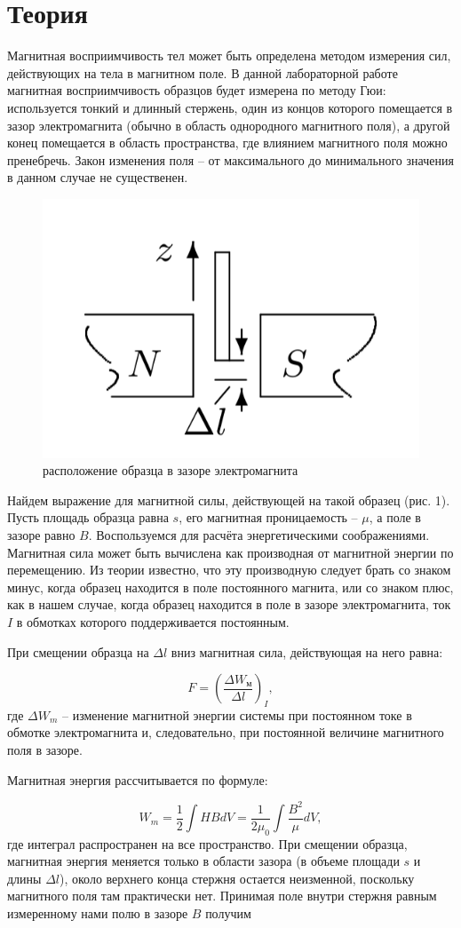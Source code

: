 \documentclass[a4paper,14pt]{article}
\begin{document}
\section*{Теория}
Магнитная восприимчивость тел может быть определена методом измерения сил, действующих на тела в магнитном поле. В данной лабораторной работе магнитная восприимчивость образцов будет измерена по методу Гюи: используется тонкий и длинный стержень, один из концов которого помещается в зазор электромагнита (обычно в область однородного магнитного поля), а другой конец помещается в область пространства, где влиянием магнитного поля можно пренебречь. Закон изменения поля -- от максимального до минимального значения в данном случае не существенен. 

\begin{figure}[bhtp]
	\centering
	\includegraphics[width=0.3\linewidth]{first}
	\caption{расположение образца в зазоре электромагнита}
\end{figure}

Найдем выражение для магнитной силы, действующей на такой образец (рис. 1). Пусть площадь образца равна $s$, его магнитная проницаемость -- $\mu$, а поле в зазоре равно $B$.
Воспользуемся для расчёта энергетическими соображениями. Магнитная сила может быть вычислена как производная от магнитной энергии по перемещению. Из теории известно, что эту производную следует брать со знаком минус, когда образец находится в поле постоянного магнита, или со знаком плюс, как в нашем случае, когда образец находится в поле в зазоре электромагнита, ток $I$ в обмотках которого поддерживается постоянным.

При смещении образца на $\Delta l$ вниз магнитная сила, действующая на него равна:

\begin{equation}
F = \left( \dfrac{\Delta W_{\text{м}}}{\Delta l}\right)_I,
\end{equation}
где $\Delta W_{m}$ -- изменение магнитной энергии системы при постоянном токе в обмотке электромагнита и, следовательно, при постоянной величине магнитного поля в зазоре.

Магнитная энергия рассчитывается по формуле:

\begin{equation}
W_{m} =  \dfrac{1}{2} \int H B dV = \dfrac{1}{2\mu_0}  \int \dfrac{B^2}{\mu} dV,
\end{equation}
где интеграл распространен на все пространство. При смещении образца, магнитная энергия меняется только в области зазора (в объеме площади $s$ и длины $\Delta l$), около верхнего конца стержня остается неизменной, поскольку магнитного поля там практически нет. Принимая поле внутри стержня равным измеренному нами полю в зазоре $B$ получим
\end{document}
